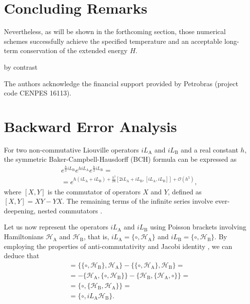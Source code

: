 \documentclass[
journal=jctcce,
layout=twocolumn
]{achemso}
\newcommand{\Ham}[1]{{\mathcal H}_\text{#1}}    %
\newcommand{\Liu}[1]{i\!L_\text{#1}}            %
\newcommand{\timestep}{h}
\begin{document}

\section{Concluding Remarks}
\label{sec:conclusion}
Nevertheless, as will be shown in the forthcoming section, those numerical schemes successfully achieve the specified temperature and an acceptable long-term conservation of the extended energy $H$.

by contrast

\begin{acknowledgement}
	The authors acknowledge the financial support provided by Petrobras (project code CENPES 16113).
\end{acknowledgement}

\appendix

\section{Backward Error Analysis}
\label{sec:rigid body shadow hamiltonian}

For two non-commutative Liouville operators $\Liu A$ and $\Liu B$ and a real constant $\timestep$, the symmetric Baker-Campbell-Hausdorff (BCH) formula can be expressed as \cite{Hairer_2006}
\begin{equation}
\label{eq:symmetric BCH}
\begin{split}
&e^{\frac{\timestep}{2} \Liu B} e^{\timestep \Liu A} e^{\frac{\timestep}{2} \Liu B} = \\
&= e^{\timestep (\Liu A + \Liu B) + \frac{\timestep^3}{24} \left[2 \Liu A + \Liu B,[\Liu A,\Liu B]\right] + \mathcal{O}(\timestep^5)},
\end{split}
\end{equation}
where $[X,Y]$ is the commutator of operators $X$ and $Y$, defined as $[X,Y] = XY - YX$.
The remaining terms of the infinite series involve ever-deepening, nested commutators \cite{Hairer_2006}.

Let us now represent the operators $\Liu A$ and $\Liu B$ using Poisson brackets involving Hamiltonians $\Ham A$ and $\Ham B$, that is, $\Liu A = \{\circ,\Ham A\}$ and $\Liu B = \{\circ,\Ham B\}$.
By employing the properties of anti-commutativity and Jacobi identity \cite{Hairer_2006}, we can deduce that
\begin{align*}
[\Liu A,\Liu B] &= \{\{\circ,\Ham B\},\Ham A\} - \{\{\circ,\Ham A\},\Ham B\} = \\
&= -\{\Ham A,\{\circ,\Ham B\}\} - \{\Ham B,\{\Ham A,\circ\}\} = \\
&= \{\circ,\{\Ham B,\Ham A\}\} = \\
&= \{\circ,{\Liu A} {\Ham B}\}.
\end{align*}
\end{document}

